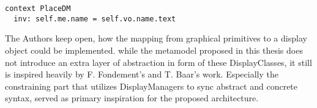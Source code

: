\begin{lstlisting}[language=OCL]
  context PlaceDM
  inv: self.me.name = self.vo.name.text
\end{lstlisting}


The Authors keep open, how the mapping from graphical primitives to a display object could be implemented. while the metamodel proposed in this thesis does not introduce an extra layer of abstraction in form of these DisplayClasses, it still is inspired heavily by F. Fondement's and T. Baar's work. Especially the constraining part that utilizes DisplayManagers to sync abstract and concrete syntax, served as primary inspiration for the proposed architecture.


